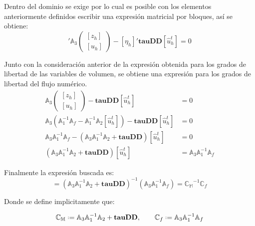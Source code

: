 \documentclass{article}
\begin{document}
\noindent Dentro del dominio se exige  por lo cual es posible con los elementos anteriormente definidos escribir una expresión matricial por bloques, así se obtiene:
\begin{equation*}
[\eta_h]' \mathbb{A}_3 
    \left(
    \begin{array}{cc}
        {[z_h]} \\
        {[u_h]}
    \end{array}
    \right )
    - [\eta_h]' \mathbf{tauDD} [\hat{u}^t_h] = 0
\end{equation*}

\noindent Junto con la consideración anterior de la expresión obtenida para los grados de libertad de las variables de volumen, se obtiene una expresión para los grados de libertad del flujo numérico.
\begin{align*}
    \mathbb{A}_3 
    \left(
    \begin{array}{cc}
        {[z_h]} \\
        {[u_h]}
    \end{array}
    \right )
    - \mathbf{tauDD} [\hat{u}^t_h] &= 0 \\
    \mathbb{A}_3 
    \left(
    \mathbb{A}_1^{-1} \mathbb{A}_f - \mathbb{A}_1^{-1} \mathbb{A}_2  [\hat{u}^t_h] 
    \right )
    - \mathbf{tauDD} [\hat{u}^t_h] &= 0 \\
    \mathbb{A}_3  \mathbb{A}_1^{-1} \mathbb{A}_f 
    - \left( \mathbb{A}_3  \mathbb{A}_1^{-1} \mathbb{A}_2  + \mathbf{tauDD} \right ) [\hat{u}^t_h] &= 0 \\
    \left( \mathbb{A}_3  \mathbb{A}_1^{-1} \mathbb{A}_2  + \mathbf{tauDD} \right ) [\hat{u}^t_h]  &=
    \mathbb{A}_3  \mathbb{A}_1^{-1} \mathbb{A}_f
\end{align*}

\noindent Finalmente la expresión buscada es:
\begin{equation}
	[\hat{u}^t_h]  = 
    \left( \mathbb{A}_3  \mathbb{A}_1^{-1} \mathbb{A}_2  + \mathbf{tauDD} \right )^{-1} ( \mathbb{A}_3  \mathbb{A}_1^{-1} \mathbb{A}_f ) = \mathbb{C_M}^{-1} \mathbb{C}_f
\end{equation}

\noindent Donde se define implicitamente que:

\begin{equation*}
	\mathbb{C_M} \defeq \mathbb{A}_3  \mathbb{A}_1^{-1} \mathbb{A}_2  + \mathbf{tauDD} , \qquad
	\mathbb{C}_f \defeq \mathbb{A}_3  \mathbb{A}_1^{-1} \mathbb{A}_f 
\end{equation*}
\end{document}
